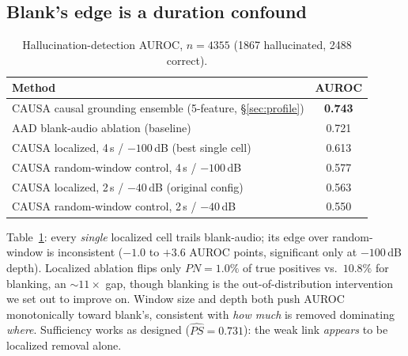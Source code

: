 \documentclass{article}
\begin{document}
\subsection{Blank's edge is a duration confound}\label{sec:durationconfound}

\begin{table}[t]
\centering
\footnotesize
\caption{Hallucination-detection AUROC, $n=4355$ (1867 hallucinated, 2488 correct).}
\label{tab:main}
\begin{tabular}{@{}lc@{}}
\toprule
Method & AUROC \\
\midrule
CAUSA causal grounding ensemble (5-feature, \S\ref{sec:profile}) & \textbf{0.743} \\
AAD blank-audio ablation (baseline) \cite{hsu2025aad} & 0.721 \\
CAUSA localized, 4\,s / $-100$\,dB (best single cell) & 0.613 \\
CAUSA random-window control, 4\,s / $-100$\,dB & 0.577 \\
CAUSA localized, 2\,s / $-40$\,dB (original config) & 0.563 \\
CAUSA random-window control, 2\,s / $-40$\,dB & 0.550 \\
\bottomrule
\end{tabular}
\end{table}

Table~\ref{tab:main}: every \emph{single} localized cell trails
blank-audio; its edge over random-window is inconsistent ($-1.0$ to
$+3.6$ AUROC points, significant only at $-100$\,dB depth). Localized
ablation flips only $\hat{PN}=1.0\%$ of true positives vs.\ $10.8\%$
for blanking, an $\sim\!11\times$ gap, though blanking is the
out-of-distribution intervention we set out to improve on. Window size
and depth both push AUROC monotonically toward blank's, consistent
with \emph{how much} is removed dominating \emph{where}. Sufficiency
works as designed ($\hat{PS}=0.731$): the weak link \emph{appears} to
be localized removal alone.
\end{document}

